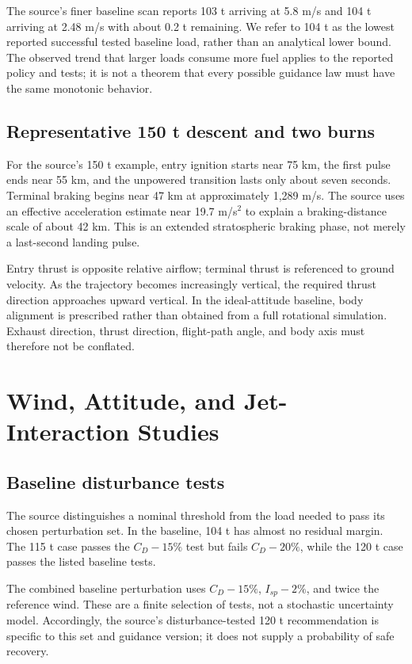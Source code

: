 \documentclass[11pt,a4paper]{article}
\begin{document}
The source's finer baseline scan reports 103 t arriving at 5.8 m/s and 104 t arriving at 2.48 m/s with about 0.2 t remaining. We refer to 104 t as the lowest reported successful tested baseline load, rather than an analytical lower bound. The observed trend that larger loads consume more fuel applies to the reported policy and tests; it is not a theorem that every possible guidance law must have the same monotonic behavior.

\subsection{Representative 150 t descent and two burns}


For the source's 150 t example, entry ignition starts near 75 km, the first pulse ends near 55 km, and the unpowered transition lasts only about seven seconds. Terminal braking begins near 47 km at approximately 1,289 m/s. The source uses an effective acceleration estimate near 19.7 m/s$^2$ to explain a braking-distance scale of about 42 km. This is an extended stratospheric braking phase, not merely a last-second landing pulse.




Entry thrust is opposite relative airflow; terminal thrust is referenced to ground velocity. As the trajectory becomes increasingly vertical, the required thrust direction approaches upward vertical. In the ideal-attitude baseline, body alignment is prescribed rather than obtained from a full rotational simulation. Exhaust direction, thrust direction, flight-path angle, and body axis must therefore not be conflated.

\section{Wind, Attitude, and Jet-Interaction Studies}
\subsection{Baseline disturbance tests}
The source distinguishes a nominal threshold from the load needed to pass its chosen perturbation set. In the baseline, 104 t has almost no residual margin. The 115 t case passes the $C_D-15\%$ test but fails $C_D-20\%$, while the 120 t case passes the listed baseline tests.



The combined baseline perturbation uses $C_D-15\%$, $I_{sp}-2\%$, and twice the reference wind. These are a finite selection of tests, not a stochastic uncertainty model. Accordingly, the source's disturbance-tested 120 t recommendation is specific to this set and guidance version; it does not supply a probability of safe recovery.
\end{document}
